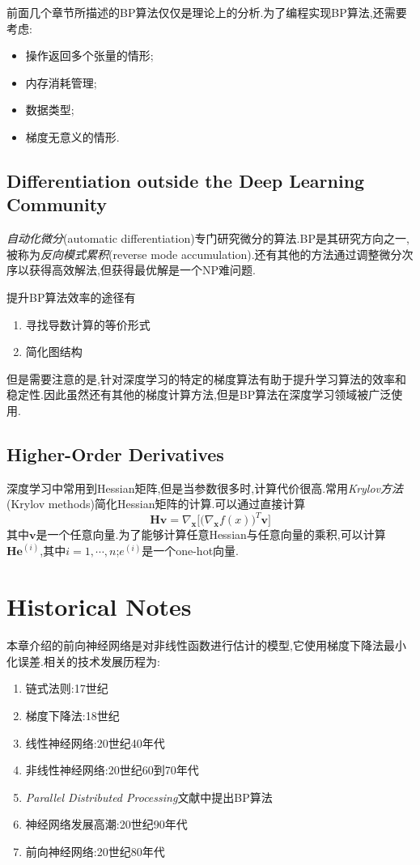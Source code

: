 前面几个章节所描述的BP算法仅仅是理论上的分析.为了编程实现BP算法,还需要考虑:
\begin{itemize}
    \item 操作返回多个张量的情形;
    \item 内存消耗管理;
    \item 数据类型;
    \item 梯度无意义的情形.
\end{itemize}

\subsection{Differentiation outside the Deep Learning Community}

\textit{自动化微分}(automatic differentiation)专门研究微分的算法.BP是其研究方向之一,被称为\textit{反向模式累积}(reverse mode accumulation).还有其他的方法通过调整微分次序以获得高效解法,但获得最优解是一个NP难问题.

提升BP算法效率的途径有
\begin{enumerate}
    \item 寻找导数计算的等价形式
    \item 简化图结构
\end{enumerate}

但是需要注意的是,针对深度学习的特定的梯度算法有助于提升学习算法的效率和稳定性.因此虽然还有其他的梯度计算方法,但是BP算法在深度学习领域被广泛使用.

\subsection{Higher-Order Derivatives}

深度学习中常用到Hessian矩阵,但是当参数很多时,计算代价很高.常用\textit{Krylov方法}(Krylov methods)简化Hessian矩阵的计算.可以通过直接计算
\begin{equation}
\bm{Hv}=\nabla_{\bm x}\Big[\big(\nabla_{\bm x}f(x)\big)^T\bm v\Big]
\end{equation}
其中$\bm v$是一个任意向量.为了能够计算任意Hessian与任意向量的乘积,可以计算$\bm{He}^{(i)}$,其中$i=1,\cdots,n$;$e^{(i)}$是一个one-hot向量.

\section{Historical Notes}

本章介绍的前向神经网络是对非线性函数进行估计的模型,它使用梯度下降法最小化误差.相关的技术发展历程为:
\begin{enumerate}
    \item 链式法则:17世纪
    \item 梯度下降法:18世纪
    \item 线性神经网络:20世纪40年代
    \item 非线性神经网络:20世纪60到70年代
    \item \textit{Parallel Distributed Processing}文献中提出BP算法
    \item 神经网络发展高潮:20世纪90年代
    \item 前向神经网络:20世纪80年代
\end{enumerate}

